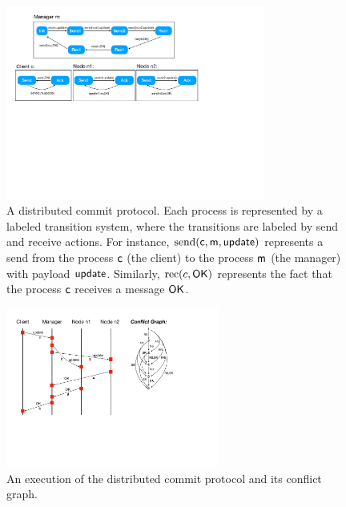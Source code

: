 \begin{figure}[t]
\begin{center}
\includegraphics[width=8.5cm]{commit.pdf}
\end{center}
\vspace{-5mm}
\caption{A distributed commit protocol. Each process is represented by a labeled transition system, where the transitions are labeled by send and receive actions. For instance, $\mathrm{send}({\sf{c},\sf{m},\sf{update}})$ represents a send from the process $\sf{c}$ (the client) to the process $\sf{m}$ (the manager) with payload $\sf{update}$. Similarly, $\mathrm{rec}({c,\sf{OK}})$ represents the fact that the process $\sf{c}$ receives a message 
$\sf{OK}$.}
\label{fig:commit}
\end{figure}

\begin{figure}[t]
\begin{center}
\includegraphics[width=7cm]{MSC-commit.pdf}
\end{center}
\vspace{-5mm}
\caption{An execution of the distributed commit protocol and its conflict graph.}
\label{fig:commit-exec}
\end{figure}

